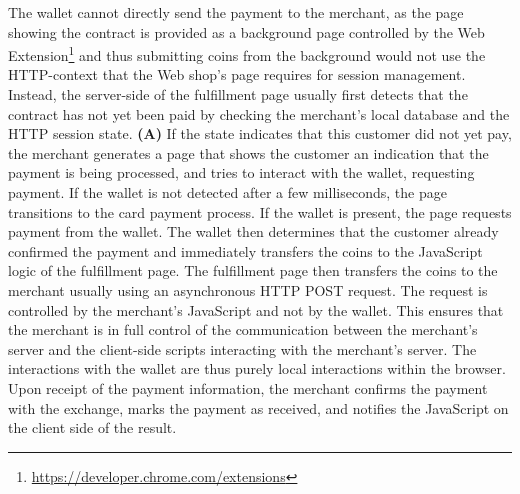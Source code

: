 \documentclass{llncs}
\begin{document}
The wallet cannot directly send
the payment to the merchant, as the page showing the contract is
provided as a background page controlled by the Web Extension\footnote{\url{https://developer.chrome.com/extensions}} and thus
submitting coins from the background would not use the HTTP-context
that the Web shop's page requires for session management.
%
Instead, the server-side of the fulfillment page usually first detects
that the contract has not yet been paid by checking the merchant's
local database and the HTTP session state.  {\bf (A)} If the state
indicates that this customer did not yet pay, the merchant generates a
page that shows the customer an indication that the payment is being
processed, and tries to interact with the wallet, requesting payment.
If the wallet is not detected after a few milliseconds, the page
transitions to the card payment process.  If the wallet is present,
the page requests payment from the wallet.  The wallet then determines
that the customer already confirmed the payment and immediately
transfers the coins to the JavaScript logic of the fulfillment page.
The fulfillment page then transfers the coins to the merchant usually
using an asynchronous HTTP POST request.  The request is controlled by
the merchant's JavaScript and not by the wallet. This ensures that the
merchant is in full control of the communication between the
merchant's server and the client-side scripts interacting with the
merchant's server.  The interactions with the wallet are thus purely
local interactions within the browser.  Upon receipt of the payment
information, the merchant confirms the payment with the exchange,
marks the payment as received, and notifies the JavaScript on the
client side of the result.
\end{document}
